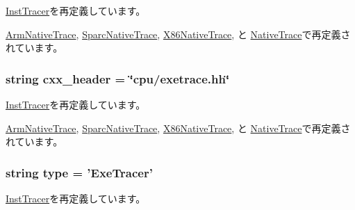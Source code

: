 \hyperlink{classInstTracer_1_1InstTracer_a58cd55cd4023648e138237cfc0822ae3}{InstTracer}を再定義しています。

\hyperlink{classArmNativeTrace_1_1ArmNativeTrace_a58cd55cd4023648e138237cfc0822ae3}{ArmNativeTrace}, \hyperlink{classSparcNativeTrace_1_1SparcNativeTrace_a58cd55cd4023648e138237cfc0822ae3}{SparcNativeTrace}, \hyperlink{classX86NativeTrace_1_1X86NativeTrace_a58cd55cd4023648e138237cfc0822ae3}{X86NativeTrace}, と \hyperlink{classNativeTrace_1_1NativeTrace_a58cd55cd4023648e138237cfc0822ae3}{NativeTrace}で再定義されています。\hypertarget{classExeTracer_1_1ExeTracer_a17da7064bc5c518791f0c891eff05fda}{
\subsubsection[{cxx\_\-header}]{\setlength{\rightskip}{0pt plus 5cm}string {\bf cxx\_\-header} = \char`\"{}cpu/exetrace.hh\char`\"{}}}
\label{classExeTracer_1_1ExeTracer_a17da7064bc5c518791f0c891eff05fda}


\hyperlink{classInstTracer_1_1InstTracer_a17da7064bc5c518791f0c891eff05fda}{InstTracer}を再定義しています。

\hyperlink{classArmNativeTrace_1_1ArmNativeTrace_a17da7064bc5c518791f0c891eff05fda}{ArmNativeTrace}, \hyperlink{classSparcNativeTrace_1_1SparcNativeTrace_a17da7064bc5c518791f0c891eff05fda}{SparcNativeTrace}, \hyperlink{classX86NativeTrace_1_1X86NativeTrace_a17da7064bc5c518791f0c891eff05fda}{X86NativeTrace}, と \hyperlink{classNativeTrace_1_1NativeTrace_a17da7064bc5c518791f0c891eff05fda}{NativeTrace}で再定義されています。\hypertarget{classExeTracer_1_1ExeTracer_acce15679d830831b0bbe8ebc2a60b2ca}{
\subsubsection[{type}]{\setlength{\rightskip}{0pt plus 5cm}string {\bf type} = '{\bf ExeTracer}'}}
\label{classExeTracer_1_1ExeTracer_acce15679d830831b0bbe8ebc2a60b2ca}


\hyperlink{classInstTracer_1_1InstTracer_acce15679d830831b0bbe8ebc2a60b2ca}{InstTracer}を再定義しています。

